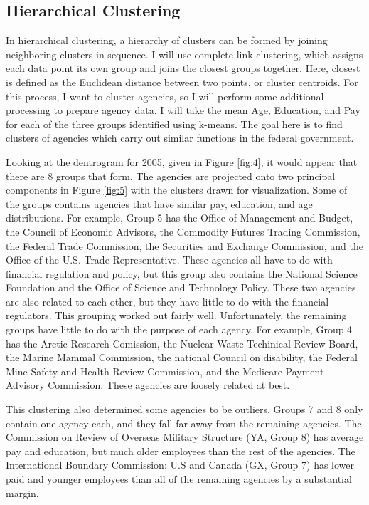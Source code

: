 \documentclass{article}
\begin{document}
    \subsection{Hierarchical Clustering}
    In hierarchical clustering, a hierarchy of clusters can be formed by joining neighboring clusters in sequence. I will use complete link clustering, which assigns each data point its own group and joins the closest groups together. Here, closest is defined as the Euclidean distance between two points, or cluster centroids. For this process, I want to cluster agencies, so I will perform some additional processing to prepare agency data. I will take the mean Age, Education, and Pay for each of the three groups identified using k-means. The goal here is to find clusters of agencies which carry out similar functions in the federal government.
    \par
    Looking at the dentrogram for 2005, given in Figure \ref{fig:4}, it would appear that there are 8 groups that form. The agencies are projected onto two principal components in Figure \ref{fig:5} with the clusters drawn for visualization. Some of the groups contains agencies that have similar pay, education, and age distributions. For example, Group 5 has the Office of Management and Budget, the Council of Economic Advisors, the Commodity Futures Trading Commission, the Federal Trade Commission, the Securities and Exchange Commission, and the Office of the U.S. Trade Representative. These agencies all have to do with financial regulation and policy, but this group also contains the National Science Foundation and the Office of Science and Technology Policy. These two agencies are also related to each other, but they have little to do with the financial regulators. This grouping worked out fairly well. Unfortunately, the remaining groups have little to do with the purpose of each agency. For example, Group 4 has the Arctic Research Comission, the Nuclear Waste Techinical Review Board, the Marine Mammal Commission, the national Council on disability, the Federal Mine Safety and Health Review Commission, and the Medicare Payment Advisory Commission. These agencies are loosely related at best.
    \par
    This clustering also determined some agencies to be outliers. Groups 7 and 8 only contain one agency each, and they fall far away from the remaining agencies. The Commission on Review of Overseas Military Structure (YA, Group 8) has average pay and education, but much older employees than the rest of the agencies. The International Boundary Commission: U.S and Canada (GX, Group 7) has lower paid and younger employees than all of the remaining agencies by a substantial margin.
\end{document}
